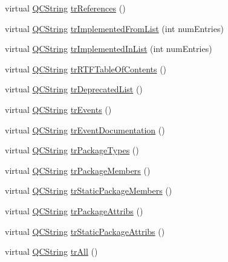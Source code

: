 \begin{DoxyCompactItemize}
\item 
virtual \mbox{\hyperlink{class_q_c_string}{Q\+C\+String}} \mbox{\hyperlink{class_translator_slovak_a9b865266add998fbfeeaf21ca28ba193}{tr\+References}} ()
\item 
virtual \mbox{\hyperlink{class_q_c_string}{Q\+C\+String}} \mbox{\hyperlink{class_translator_slovak_a9d0752a3ea6aad4a91199edd4138f1bb}{tr\+Implemented\+From\+List}} (int num\+Entries)
\item 
virtual \mbox{\hyperlink{class_q_c_string}{Q\+C\+String}} \mbox{\hyperlink{class_translator_slovak_a61b11ed9be30c8da14d4d9e7ea984a43}{tr\+Implemented\+In\+List}} (int num\+Entries)
\item 
virtual \mbox{\hyperlink{class_q_c_string}{Q\+C\+String}} \mbox{\hyperlink{class_translator_slovak_ac839def36a70430a69deb2f95790c24d}{tr\+R\+T\+F\+Table\+Of\+Contents}} ()
\item 
virtual \mbox{\hyperlink{class_q_c_string}{Q\+C\+String}} \mbox{\hyperlink{class_translator_slovak_a8cd761f5762a965cdbd6175e0e965611}{tr\+Deprecated\+List}} ()
\item 
virtual \mbox{\hyperlink{class_q_c_string}{Q\+C\+String}} \mbox{\hyperlink{class_translator_slovak_aef34c61565248c43fe766e85ed657af7}{tr\+Events}} ()
\item 
virtual \mbox{\hyperlink{class_q_c_string}{Q\+C\+String}} \mbox{\hyperlink{class_translator_slovak_a80d1c8a7588136af82900473f1cc769d}{tr\+Event\+Documentation}} ()
\item 
virtual \mbox{\hyperlink{class_q_c_string}{Q\+C\+String}} \mbox{\hyperlink{class_translator_slovak_a3b049734d78df2c2b5851d986e066aea}{tr\+Package\+Types}} ()
\item 
virtual \mbox{\hyperlink{class_q_c_string}{Q\+C\+String}} \mbox{\hyperlink{class_translator_slovak_a52c24235372528bd1b98f8ddd80e1d1d}{tr\+Package\+Members}} ()
\item 
virtual \mbox{\hyperlink{class_q_c_string}{Q\+C\+String}} \mbox{\hyperlink{class_translator_slovak_a6e09843251685c05db33ff4af1218b0e}{tr\+Static\+Package\+Members}} ()
\item 
virtual \mbox{\hyperlink{class_q_c_string}{Q\+C\+String}} \mbox{\hyperlink{class_translator_slovak_a8cebd149efd746b844fe442125ce6e35}{tr\+Package\+Attribs}} ()
\item 
virtual \mbox{\hyperlink{class_q_c_string}{Q\+C\+String}} \mbox{\hyperlink{class_translator_slovak_afd4a05cc583ac0ff34451be0e547ced7}{tr\+Static\+Package\+Attribs}} ()
\item 
virtual \mbox{\hyperlink{class_q_c_string}{Q\+C\+String}} \mbox{\hyperlink{class_translator_slovak_a6225883618afc640a84970f4912994a0}{tr\+All}} ()

\end{DoxyCompactItemize}
